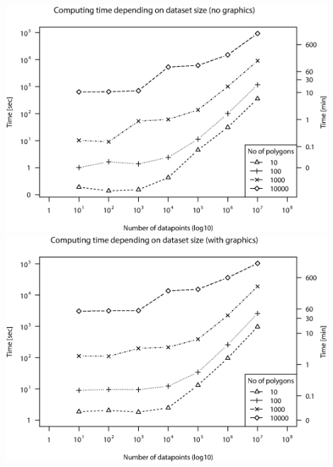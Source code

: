 \documentclass[a4paper,titlepage,11pt]{scrreprt}
\begin{document}
\centering
\includegraphics[width=0.9\textwidth]{figures/bm_no_graphics.eps}\\
\vspace{2cm}
\includegraphics[width=0.9\textwidth]{figures/bm_graphics.eps}


{}
\end{document}
